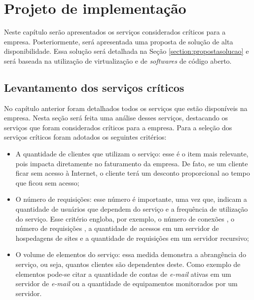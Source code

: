 \chapter{Projeto de implementação}
\label{cap:projetoimplementacao}

Neste capítulo serão apresentados os serviços considerados críticos para a empresa. Posteriormente, será apresentada uma proposta de solução 
de alta disponibilidade. Essa solução será detalhada na Seção \ref{section:propostasolucao} e será baseada na utilização de virtualização e 
de \textit{softwares} de código aberto. 

\section{Levantamento dos serviços críticos}
\label{section:servcrit}

No capítulo anterior foram detalhados todos os serviços que estão disponíveis na empresa. Nesta seção será feita uma análise desses
serviços, destacando os serviços que foram considerados críticos para a empresa. Para a seleção dos serviços críticos foram adotados os 
seguintes critérios:
\begin{itemize}
 \item A quantidade de clientes que utilizam o serviço: esse é o item mais relevante, pois impacta diretamente no faturamento
 da empresa. De fato, se um cliente ficar sem acesso à Internet, o cliente terá um desconto proporcional ao tempo que ficou sem 
 acesso; 
 \item O número de requisições: esse número é importante, uma vez que, indicam a quantidade de usuários que dependem do serviço e a frequência
 de utilização do serviço. Esse critério engloba, por exemplo, o número de conexões  \cite{tanenbaum2011}, o número de requisições 
  \cite{tanenbaum2011}, a quantidade de acessos em um servidor de hospedagens de sites e a quantidade de requisições  
 em um servidor recursivo;
 \item O volume de elementos do serviço: essa medida demonstra a abrangência do serviço, ou seja, quantos clientes são dependentes deste. 
 Como exemplo de elementos pode-se citar a quantidade de contas de \textit{e-mail} ativas em um servidor de \textit{e-mail} ou a quantidade de 
 equipamentos monitorados por um servidor.
\end{itemize}

